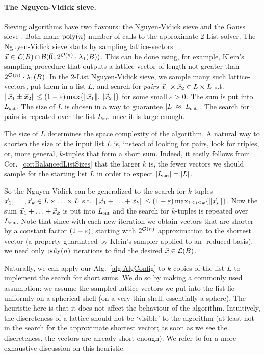\paragraph{The Nguyen-Vidick sieve.} Sieving algorithms have two flavours: the Nguyen-Vidick sieve \cite{NguVid08} and the Gauss sieve \cite{STOC:MicVou10}. Both make $\mathrm{poly}(n)$ number of calls to the approximate $2$-List solver. The Nguyen-Vidick sieve starts by sampling lattice-vectors $\xvec \in \Lat(B) \cap \Ball(\zerovec, 2^{\bigO(n)} \cdot \lambda_1(B))$. This can be done using, for example, Klein's sampling procedure \cite{SODA:Klein00} that outputs a lattice-vector of length not greater than $2^{\mathcal{O}(n)} \cdot \lambda_1(B)$.  In the $2$-List Nguyen-Vidick sieve, we sample many such lattice-vectors, put them in a list $L$, and search for \emph{pairs} $\vec x_1 \times \vec x_2 \in L \times L$ s.t. $\| \vec x_1 \pm \vec x_2 \| \leq (1-\varepsilon) \max\{\| \vec x_1 \|, \| \vec x_2 \|\}$ for some small $\varepsilon>0$. The sum is put into $\Lout$. The size of $L$ is chosen in a way to guarantee $\normalabs{L} \approx \normalabs{\Lout}$. The search for pairs is repeated over the list $\Lout$ once it is large enough. 

The size of $L$ determines the space complexity of the algorithm. A natural way to shorten the size of the input list $L$ is, instead of looking for pairs, look for triples, or, more general, $k$-tuples that form a short sum. Indeed, it easily follows from Cor.~\ref{cor:BalancedListSizes} that the larger $k$ is, the fewer vectors we should sample for the starting list  $L$ in order to expect $\normalabs{\Lout} = \normalabs{L}$. 

So the Nguyen-Vidick can be generalized to the search for $k$-tuples $\vec x_1, \ldots, \vec x_k \in L \times \ldots \times L$ s.t.\ $\| \vec x_1 + \ldots + \vec x_k \| \leq (1-\varepsilon) \max_{1 \leq i \leq k} \{\| \vec x_i\|\}$. Now the sum $\vec x_1 + \ldots + \vec x_k$ is put into $\Lout$ and the search for $k$-tuples is repeated over $\Lout$. Note that since with each new iteration we obtain vectors that are shorter by a constant factor $(1-\varepsilon)$, starting with $2^{\mathcal{O}(n)}$ approximation to the shortest vector (a property guaranteed by Klein's sampler applied to an \LLL-reduced basis), we need only $\mathrm{poly}(n)$ iterations to find the desired $\vec x \in \mathcal{L}(B)$.

Naturally, we can apply our Alg.~\ref{alg:AlgConfig} to $k$ copies of the list $L$ to implement the search for short sums. We do so by making a commonly used assumption: we assume the sampled lattice-vectors we put into the list lie uniformly on a spherical shell (on a very thin shell, essentially a sphere). The heuristic here is that it does not affect the behaviour of the algorithm. Intuitively, the discreteness of a lattice should not be `visible' to the algorithm (at least not in the search for the approximate shortest vector; as soon as we see the discreteness, the vectors are already short enough). We refer to \cite{NguVid08} for a more exhaustive discussion on this heuristic. 

